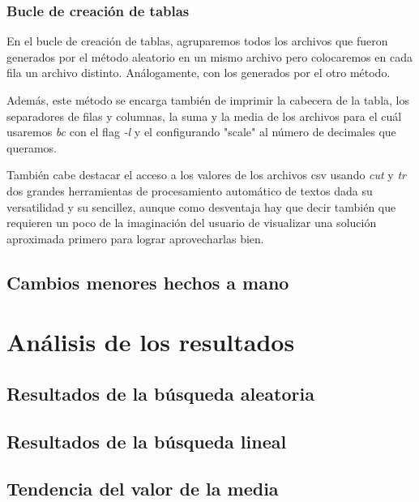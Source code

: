 \documentclass[a4paper, 11pt]{article}
\begin{document}
		\subsubsection{Bucle de creación de tablas}
			En el bucle de creación de tablas, agruparemos todos los archivos que fueron generados por el método aleatorio en
			un mismo archivo pero colocaremos en cada fila un archivo distinto. Análogamente, con los generados por el otro
			método.
			
			Además, este método se encarga también de imprimir la cabecera de la tabla, los separadores de filas y columnas,
			la suma y la media de los archivos para el cuál usaremos \textit{bc} con el flag \textit{-l} y el configurando
			"scale" al número de decimales que queramos.
			
			También cabe destacar el acceso a los valores de los archivos csv usando \textit{cut} y \textit{tr} dos grandes
			herramientas de procesamiento automático de textos dada su versatilidad y su sencillez, aunque como desventaja
			hay que decir también que requieren un poco de la imaginación del usuario de visualizar una solución aproximada
			primero para lograr aprovecharlas bien.

	\subsection{Cambios menores hechos a mano}

\section{Análisis de los resultados}
	\subsection{Resultados de la búsqueda aleatoria}
	\subsection{Resultados de la búsqueda lineal}
	\subsection{Tendencia del valor de la media}
\end{document}
